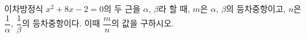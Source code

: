 이차방정식 $x^2+8x-2=0$의 두 근을 $\alpha$, $\beta$라 할 때, $m$은 $\alpha$, $\beta$의 등차중항이고, $n$은 $\dfrac{1}{\alpha}$, $\dfrac{1}{\beta}$의 등차중항이다. 이때 $\dfrac{m}{n}$의 값을 구하시오.
